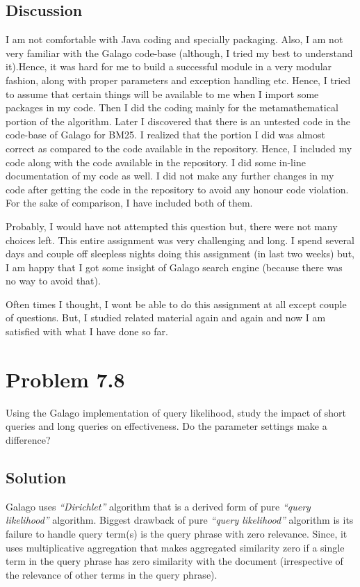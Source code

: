 \documentclass[letterpaper,12pt]{article}
\begin{document}
\subsection{Discussion}

I am not comfortable with Java coding and specially packaging. Also, I am not very familiar with the Galago code-base (although, I tried my best to understand it).Hence, it was hard for me to build a successful module in a very modular fashion, along with proper parameters and exception handling etc. Hence, I tried to assume that certain things will be available to me when I import some packages in my code. Then I did the coding mainly for the metamathematical portion of the algorithm. Later I discovered that there is an untested code in the code-base of Galago for BM25. I realized that the portion I did was almost correct as compared to the code available in the repository. Hence, I included my code along with the code available in the repository. I did some in-line documentation of my code as well. I did not make any further changes in my code after getting the code in the repository to avoid any honour code violation. For the sake of comparison, I have included both of them.

Probably, I would have not attempted this question but, there were not many choices left. This entire assignment was very challenging and long. I spend several days and couple off sleepless nights doing this assignment (in last two weeks) but, I am happy that I got some insight of Galago search engine (because there was no way to avoid that).

Often times I thought, I wont be able to do this assignment at all except couple of questions. But, I studied related material again and again and now I am satisfied with what I have done so far.


\pagebreak


\section{Problem 7.8}

Using the Galago implementation of query likelihood, study the impact of short queries and long queries on effectiveness. Do the parameter settings make a difference?

\subsection{Solution}

Galago uses \emph{``Dirichlet''} algorithm that is a derived form of pure \emph{``query likelihood''} algorithm. Biggest drawback of pure \emph{``query likelihood''} algorithm is its failure to handle query term(s) is the query phrase with zero relevance. Since, it uses multiplicative aggregation that makes aggregated similarity zero if a single term in the query phrase has zero similarity with the document (irrespective of the relevance of other terms in the query phrase).
\end{document}
